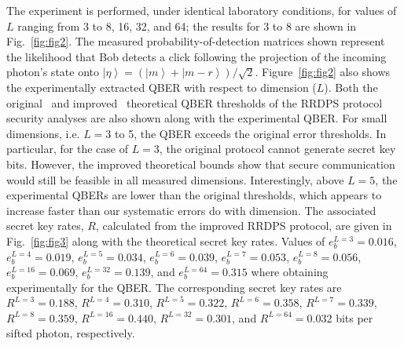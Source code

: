 \documentclass[twocolumn,aps,prl,floatfix,superscriptaddress]{revtex4-1}
\newcommand{\ket}[1]{\left| #1 \right\rangle}
\begin{document}

The experiment is performed, under identical laboratory conditions, for values of $L$ ranging from 3 to 8, 16, 32, and 64; the results for 3 to 8 are shown in Fig.~\ref{fig:fig2}. The measured probability-of-detection matrices shown represent the likelihood that Bob detects a click following the projection of the incoming photon's state onto $\ket{\eta}=(\ket{m}+\ket{m-r} )/\sqrt{2}$. Figure~\ref{fig:fig2} also shows the experimentally extracted QBER with respect to dimension ($L$). Both the original~\cite{sasaki:14} and improved~\cite{Yin:18} theoretical QBER thresholds of the RRDPS protocol security analyses are also shown along with the experimental QBER. For small dimensions, i.e. $L=3$ to 5, the QBER exceeds the original error thresholds. In particular, for the case of $L=3$, the original protocol cannot generate secret key bits. However, the improved theoretical bounds show that secure communication would still be feasible in all measured dimensions. Interestingly, above $L=5$, the experimental QBERs are lower than the original thresholds, which appears to increase faster than our systematic errors do with dimension. The associated secret key rates, $R$, calculated from the improved RRDPS protocol, are given in Fig.~\ref{fig:fig3} along with the theoretical secret key rates. Values of $e_b^{L=3}=0.016$, $e_b^{L=4}=0.019$, $e_b^{L=5}=0.034$, $e_b^{L=6}=0.039$, $e_b^{L=7}=0.053$, $e_b^{L=8}=0.056$, $e_b^{L=16}=0.069$, $e_b^{L=32}=0.139$, and $e_b^{L=64}=0.315$ where obtaining experimentally for the QBER. The corresponding secret key rates are $R^{L=3}=0.188$, $R^{L=4}=0.310$, $R^{L=5}=0.322$, $R^{L=6}=0.358$, $R^{L=7}=0.339$, $R^{L=8}=0.359$, $R^{L=16}=0.440$, $R^{L=32}=0.301$, and $R^{L=64}=0.032$ bits per sifted photon, respectively.%
\end{document}
